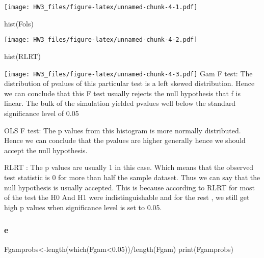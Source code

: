 \documentclass[
]{article}
\newenvironment{Shaded}{\begin{snugshade}}{\end{snugshade}}
\newcommand{\FloatTok}[1]{\textcolor[rgb]{0.00,0.00,0.81}{#1}}
\newcommand{\FunctionTok}[1]{\textcolor[rgb]{0.00,0.00,0.00}{#1}}
\newcommand{\NormalTok}[1]{#1}
\newcommand{\OtherTok}[1]{\textcolor[rgb]{0.56,0.35,0.01}{#1}}
\newcommand{\SpecialCharTok}[1]{\textcolor[rgb]{0.00,0.00,0.00}{#1}}
\begin{document}
\texttt{[image: HW3\_files/figure-latex/unnamed-chunk-4-1.pdf]}

\begin{Shaded}
\begin{Highlighting}[]
\FunctionTok{hist}\NormalTok{(Fols)}
\end{Highlighting}
\end{Shaded}

\texttt{[image: HW3\_files/figure-latex/unnamed-chunk-4-2.pdf]}

\begin{Shaded}
\begin{Highlighting}[]
\FunctionTok{hist}\NormalTok{(RLRT)}
\end{Highlighting}
\end{Shaded}

\texttt{[image: HW3\_files/figure-latex/unnamed-chunk-4-3.pdf]} Gam F
test: The distribution of pvalues of this particular test is a left
skewed distribution. Hence we can conclude that this F test usually
rejects the null hypothesis that f is linear. The bulk of the simulation
yielded pvalues well below the standard significance level of 0.05

OLS F test: The p values from this histogram is more normally
distributed. Hence we can conclude that the pvalues are higher generally
hence we should accept the null hypothesis.

RLRT : The p values are usually 1 in this case. Which means that the
observed test statistic is 0 for more than half the sample dataset. Thus
we can say that the null hypothesis is usually accepted. This is because
according to RLRT for most of the test the H0 And H1 were
indistinguishable and for the rest , we still get high p values when
significance level is set to 0.05.

\hypertarget{e}{%
\subsubsection{e}\label{e}}

\begin{Shaded}
\begin{Highlighting}[]
\NormalTok{Fgamprobs}\OtherTok{\textless{}{-}}\FunctionTok{length}\NormalTok{(}\FunctionTok{which}\NormalTok{(Fgam}\SpecialCharTok{\textless{}}\FloatTok{0.05}\NormalTok{))}\SpecialCharTok{/}\FunctionTok{length}\NormalTok{(Fgam)}
\FunctionTok{print}\NormalTok{(Fgamprobs)}
\end{Highlighting}
\end{Shaded}
\end{document}
